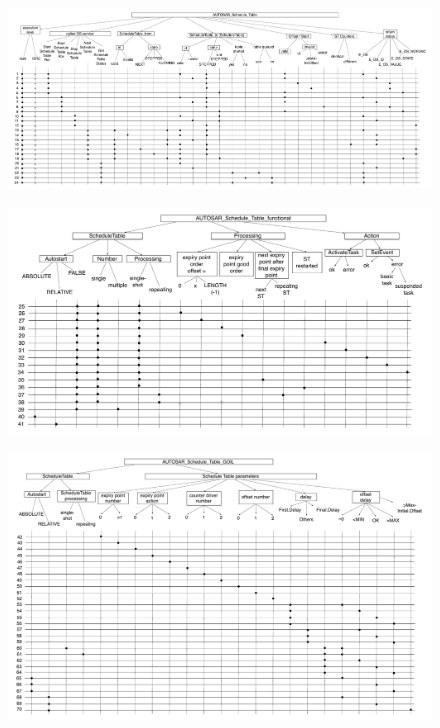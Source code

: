 \documentclass[10pt]{article}
\begin{document}
	\begin{figure}[htbp] %
   		\centering
		\includegraphics[width=1\textheight, angle=90]{graphics/AUTOSAR_Schedule_Table.pdf}
	\end{figure}

	\begin{figure}[htbp] %
   		\centering
		\includegraphics[width=1\textwidth]{graphics/AUTOSAR_Schedule_Table_functional.pdf}
	\end{figure}

	\begin{figure}[htbp] %
   		\centering
		\includegraphics[width=1\textwidth]{graphics/AUTOSAR_Schedule_Table_GOIL.pdf}
	\end{figure}
\end{document}
